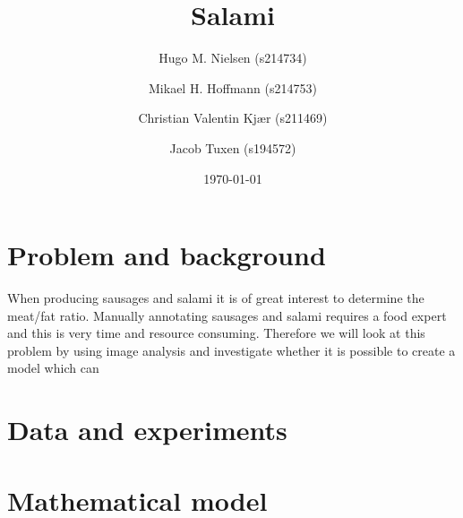 \documentclass{article}
\title{Salami}
\author{Hugo M. Nielsen (s214734) \and Mikael H. Hoffmann (s214753) \and Christian Valentin Kjær (s211469) \and Jacob Tuxen (s194572)}
\date{\today}
\begin{document}
\maketitle
\section{Problem and background}
When producing sausages and salami it is of great interest to determine the meat/fat ratio. Manually annotating sausages and salami requires a food expert and this is very time and resource consuming. 
Therefore we will look at this problem by using image analysis and investigate whether it is possible to create a model which can 
 
\section{Data and experiments}


\section{Mathematical model}
\end{document}
